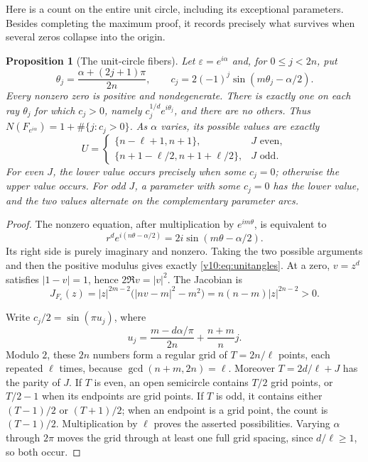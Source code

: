 \documentclass[UTF8,11pt]{ctexart}
\newtheorem{prop}[thm]{Proposition}
\theoremstyle{definition}
\numberwithin{equation}{section}
\begin{document}
Here is a count on the entire unit circle, including its exceptional
parameters. Besides completing the maximum proof, it records precisely
what survives when several zeros collapse into the origin.
\begin{prop}[The unit-circle fibers]
\label{v10:prop:unitcircle}
Let $\varepsilon=e^{i\alpha}$ and, for $0\le j<2n$, put
\begin{equation}\label{v10:eq:unitangles}
 \theta_j=\frac{\alpha+(2j+1)\pi}{2n},\qquad
 c_j=2(-1)^j\sin(m\theta_j-\alpha/2).
\end{equation}
Every nonzero zero is positive and nondegenerate. There is exactly
one on each ray $\theta_j$ for which $c_j>0$, namely
$c_j^{1/d}e^{i\theta_j}$, and there are no others. Thus
$N(F_{e^{i\alpha}})=1+\#\{j:c_j>0\}$.
As $\alpha$ varies, its possible values are exactly
\begin{equation}\label{v10:eq:unitcounts}
 U=\begin{cases}
 \{n-\ell+1,n+1\},&J\text{ even},\\
 \{n+1-\ell/2,n+1+\ell/2\},&J\text{ odd}.
 \end{cases}
\end{equation}
For even $J$, the lower value occurs precisely when some $c_j=0$;
otherwise the upper value occurs. For odd $J$, a parameter with
some $c_j=0$ has the lower value, and the two values alternate
on the complementary parameter arcs.
\end{prop}
\begin{proof}
The nonzero equation, after multiplication by $e^{im\theta}$,
is equivalent to
\[
 r^d e^{i(n\theta-\alpha/2)}
 =2i\sin(m\theta-\alpha/2).
\]
Its right side is purely imaginary and nonzero. Taking the two
possible arguments and then the positive modulus gives exactly
\eqref{v10:eq:unitangles}. At a zero, $v=z^d$ satisfies
$|1-v|=1$, hence $2\Re v=|v|^2$. The Jacobian is
\[
 J_{F_\varepsilon}(z)
 =|z|^{2m-2}\bigl(|nv-m|^2-m^2\bigr)
 =n(n-m)|z|^{2n-2}>0.
\]

Write $c_j/2=\sin(\pi u_j)$, where
\[
 u_j=\frac{m-d\alpha/\pi}{2n}+\frac{n+m}{n}j.
\]
Modulo $2$, these $2n$ numbers form a regular grid of
$T=2n/\ell$ points, each repeated $\ell$ times, because
$\gcd(n+m,2n)=\ell$. Moreover $T=2d/\ell+J$ has the parity
of $J$. If $T$ is even, an open semicircle contains $T/2$
grid points, or $T/2-1$ when its endpoints are grid points.
If $T$ is odd, it contains either $(T-1)/2$ or $(T+1)/2$;
when an endpoint is a grid point, the count is $(T-1)/2$.
Multiplication by $\ell$ proves the asserted possibilities.
Varying $\alpha$ through $2\pi$ moves the grid through at least
one full grid spacing, since $d/\ell\ge1$, so both occur.
\end{proof}
\end{document}
